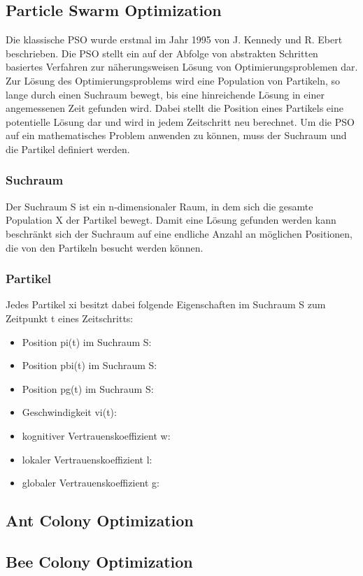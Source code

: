 \documentclass[a4paper, 11pt]{article}
\begin{document}
\subsection{Particle Swarm Optimization}
Die klassische \ac{PSO} wurde erstmal im Jahr 1995 von J. Kennedy und R. Ebert beschrieben. Die \acs{PSO} stellt ein auf der Abfolge von abstrakten Schritten basiertes Verfahren zur näherungsweisen Lösung von Optimierungsproblemen dar. Zur Lösung des Optimierungsproblems wird eine Population von Partikeln, so lange durch einen Suchraum bewegt, bis eine hinreichende Lösung in einer angemessenen Zeit gefunden wird. Dabei stellt die Position eines Partikels eine potentielle Lösung dar und wird in jedem Zeitschritt neu berechnet. Um die \acs{PSO} auf ein mathematisches Problem anwenden zu können, muss der Suchraum und die Partikel definiert werden.
\subsubsection{Suchraum}
Der Suchraum S ist ein n-dimensionaler Raum, in dem sich die gesamte Population X der Partikel bewegt. Damit eine Lösung gefunden werden kann beschränkt sich der Suchraum auf eine endliche Anzahl an möglichen Positionen, die von den Partikeln besucht werden können.
\subsubsection{Partikel}
Jedes Partikel xi besitzt dabei folgende Eigenschaften im Suchraum S zum Zeitpunkt t eines Zeitschritts:
\begin{itemize}
	\item Position pi(t) im Suchraum S:
	\item Position pbi(t) im Suchraum S:
	\item Position pg(t) im Suchraum S:
	\item Geschwindigkeit vi(t):
	\item kognitiver Vertrauenskoeffizient w:
	\item lokaler Vertrauenskoeffizient l:
	\item globaler Vertrauenskoeffizient g:
\end{itemize}


\subsection{Ant Colony Optimization}
\subsection{Bee Colony Optimization}
\end{document}
